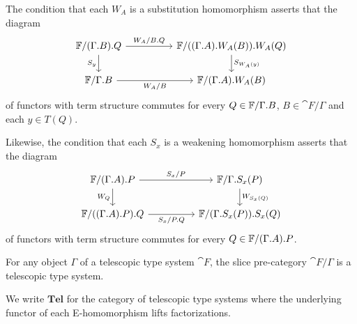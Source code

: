 \begin{rmk}
The condition that each $W_A$ is a substitution homomorphism asserts that
the diagram
\begin{equation*}
\begin{tikzcd}[column sep=huge]
\cat{F}/\ctxext{{\Gamma}{B}}{Q}
  \arrow[r,"W_A/\ctxext{B}{Q}"]
  \arrow[d,swap,"S_y"]
  &
\cat{F}/\ctxext{{{\Gamma}{A}}{W_A(B)}}{W_A(Q)}
  \arrow[d,"S_{W_A(y)}"]
  \\
\cat{F}/\ctxext{\Gamma}{B}
  \arrow[r,swap,"W_A/B"]
  &
\cat{F}/\ctxext{{\Gamma}{A}}{W_A(B)}
\end{tikzcd}
\end{equation*}
of functors with term structure commutes for every 
$Q\in\cat{F}/\ctxext{\Gamma}{B}$, $B\in\cat{F}/\Gamma$ and each $y\in T(Q)$.

Likewise, the condition that each $S_x$ is a weakening homomorphism
asserts that the diagram
\begin{equation*}
\begin{tikzcd}[column sep=huge]
\cat{F}/\ctxext{{\Gamma}{A}}{P}
  \arrow[r,"S_x/P"]
  \arrow[d,swap,"W_Q"]
  &
\cat{F}/\ctxext{\Gamma}{S_x(P)}
  \arrow[d,"W_{S_x(Q)}"]
  \\
\cat{F}/\ctxext{{{\Gamma}{A}}{P}}{Q}
  \arrow[r,swap,"S_x/\ctxext{P}{Q}"]
  &
\cat{F}/\ctxext{{\Gamma}{S_x(P)}}{S_x(Q)}
\end{tikzcd}
\end{equation*}
of functors with term structure commutes for every 
$Q\in\cat{F}/\ctxext{{\Gamma}{A}}{P}$.
\end{rmk}

\begin{cor}
For any object $\Gamma$ of a telescopic type system $\cat{F}$, the slice pre-category $\cat{F}/\Gamma$
is a telescopic type system.
\end{cor}

\begin{defn}
We write $\mathbf{Tel}$ for the category of telescopic type systems where the underlying
functor of each E-homomorphism lifts factorizations.
\end{defn} 

\begin{comment}
\begin{rmk}[Needs more precision]
Consider the category $E$ generated by the graph consisting of the objects of 
the underlying category of an $E$-system $\mathcal{E}$ as edges, and the morphisms
$S_t:X\to Y$ and $W_A:Y\to X$ as edges, subject to the axioms of an $E$-systems.
 
Any morphism of $E$ can be rewritten in a unique way
as a composition $\tilde S\circ \tilde W$, where $\tilde S$ is a morphism in
substitution-normal form, $\tilde W$ is in weakening normal form, every term
expression is in normal form, and where
each occurence of $S_x\circ W_A$ and $S_{\tfid{A}}\circ W_A/A$ is eliminated.
\end{rmk}
\end{comment}

